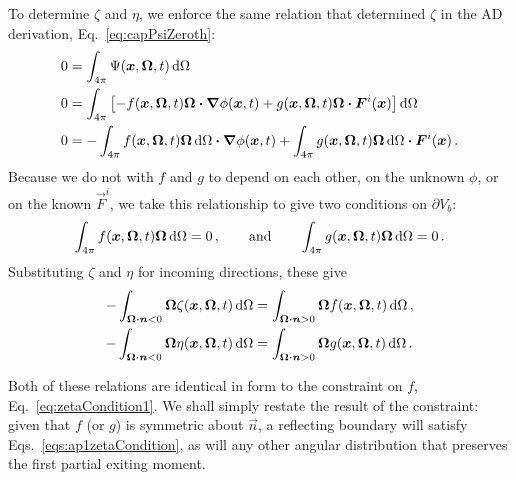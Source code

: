 To determine $\zeta$ and $\eta$, we enforce the same relation that determined
$\zeta$ in the AD derivation, Eq.~\eqref{eq:capPsiZeroth}:
\begin{align*}
  0 &= \int_{4\pi} \Psi(\bm{x}, \bm{\Omega}, t) \mathop{}\!\mathrm{d}\Omega
  \\
  0 &= \int_{4\pi} \left[  - f(\bm{x}, \bm{\Omega}, t) \bm{\Omega}\bm{\cdot} \bm{\nabla} \phi(\bm{x}, t)
+ g(\bm{x}, \bm{\Omega}, t) \bm{\Omega}\bm{\cdot} \bm{F}^i(\bm{x})
 \right]  \mathop{}\!\mathrm{d}\Omega
  \\
  0 &=
- \int_{4\pi} f(\bm{x}, \bm{\Omega}, t) \bm{\Omega} \mathop{}\!\mathrm{d}\Omega
  \bm{\cdot} \bm{\nabla} \phi(\bm{x}, t)
+ \int_{4\pi} g(\bm{x}, \bm{\Omega}, t) \bm{\Omega} \mathop{}\!\mathrm{d}\Omega
  \bm{\cdot} \bm{F}^i(\bm{x}) \,.
\end{align*}
Because we do not with $f$ and $g$ to depend on each other, on the unknown
$\phi$, or on the known $\vec{F}^i$, we take this relationship to give two
conditions on $\partial V_b$:
\begin{equation*}
  \int_{4\pi} f(\bm{x}, \bm{\Omega}, t) \bm{\Omega} \mathop{}\!\mathrm{d}\Omega = 0\,,
  \qquad \text{and} \qquad
  \int_{4\pi} g(\bm{x}, \bm{\Omega}, t) \bm{\Omega} \mathop{}\!\mathrm{d}\Omega = 0\,.
\end{equation*}
Substituting $\zeta$ and $\eta$ for incoming directions, these give
\begin{subequations} \label{eqs:ap1zetaCondition}
\begin{align} \label{eq:ap1zetaCondition}
- \int_{\bm{\Omega} \bm{\cdot} \bm{n} < 0}
 \bm{\Omega} \zeta(\bm{x}, \bm{\Omega}, t)\mathop{}\!\mathrm{d}\Omega
 &=
 \int_{\bm{\Omega} \bm{\cdot} \bm{n} > 0}
  \bm{\Omega} f(\bm{x}, \bm{\Omega}, t)\mathop{}\!\mathrm{d}\Omega \,,
\\ \label{eq:ap1etaCondition}
- \int_{\bm{\Omega} \bm{\cdot} \bm{n} < 0}
 \bm{\Omega} \eta(\bm{x}, \bm{\Omega}, t)\mathop{}\!\mathrm{d}\Omega
 &=
 \int_{\bm{\Omega} \bm{\cdot} \bm{n} > 0}
  \bm{\Omega} g(\bm{x}, \bm{\Omega}, t)\mathop{}\!\mathrm{d}\Omega \,.
\end{align}
\end{subequations}

Both of these relations are identical in form to the constraint on $f$,
Eq.~\eqref{eq:zetaCondition1}. We shall simply restate the result of the
constraint: given that $f$ (or $g$) is symmetric about $\vec{n}$, a reflecting
boundary will satisfy Eqs.~\eqref{eqs:ap1zetaCondition}, as will any other
angular distribution that preserves the first partial exiting moment.

